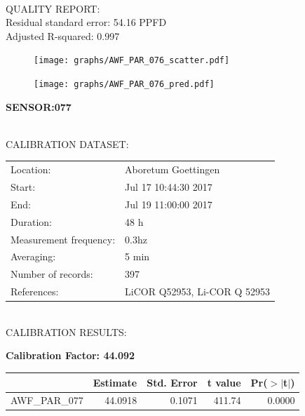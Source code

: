 \documentclass[oneside]{report}
\begin{document}
\hrulefill\\
QUALITY REPORT:\\
Residual standard error: 54.16 PPFD\\
Adjusted R-squared: 0.997



\begin{figure}[H]
  \centering
  \texttt{[image: graphs/AWF\_PAR\_076\_scatter.pdf]}
\end{figure}




\begin{figure}[H]
  \centering
  \texttt{[image: graphs/AWF\_PAR\_076\_pred.pdf]}
\end{figure}

\pagebreak


\begin{center}
\large{\textbf{SENSOR:077}}\\
\end{center}

\hrulefill\\
CALIBRATION DATASET:\\
\begin{table}[h!]
  \centering
  \label{tab:table1}
  \begin{tabular}{ll}
    Location: & Aboretum Goettingen\\ 
    
    
    Start:  & Jul 17 10:44:30 2017 \\
    End:   & Jul 19 11:00:00 2017\\ 
    Duration: & 48 h\\
    Measurement frequency: & 0.3hz\\
    Averaging:  &5 min\\
    Number of records: & 397 \\
    References: & LiCOR Q52953, Li-COR Q 52953 \\
  \end{tabular}
\end{table}

\hrulefill\\
CALIBRATION RESULTS:\\


\begin{center}
\textbf{\large{Calibration Factor: 44.092}}\\
\end{center}
\begin{table}[ht]
\centering
\begin{tabular}{rrrrr}
  \hline
 & Estimate & Std. Error & t value & Pr($>$$|$t$|$) \\ 
  \hline
AWF\_PAR\_077 & 44.0918 & 0.1071 & 411.74 & 0.0000 \\ 
   \hline
\end{tabular}
\end{table}
\end{document}
